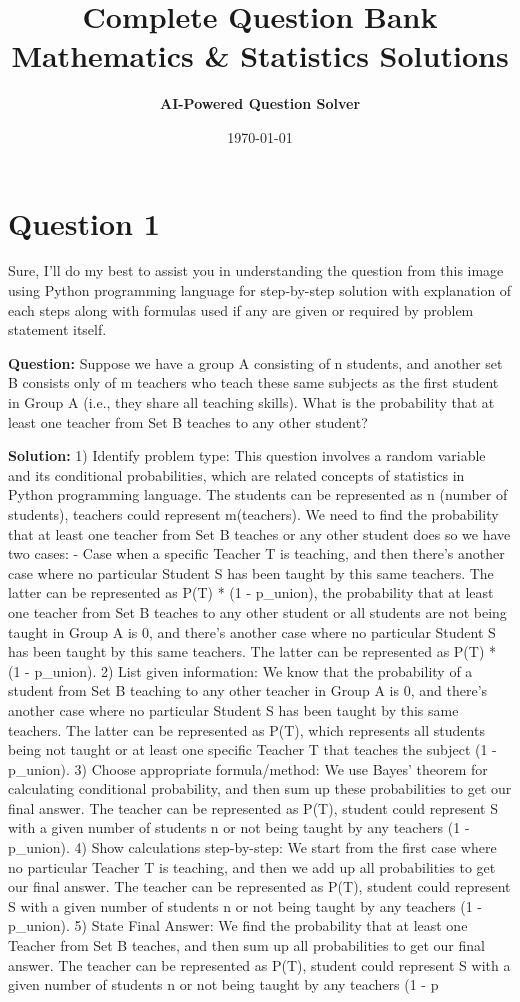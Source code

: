 \documentclass[12pt]{article}
\title{\textbf{Complete Question Bank}\\
\large{Mathematics \& Statistics Solutions}}
\author{\textbf{AI-Powered Question Solver}}
\date{\today}
\begin{document}
\maketitle
\newpage


\section*{Question 1}\n
Sure, I'll do my best to assist you in understanding the question from this image using Python programming language for step-by-step solution with explanation of each steps along with formulas used if any are given or required by problem statement itself. 

\textbf{Question:} Suppose we have a group A consisting of n students, and another set B consists only of m teachers who teach these same subjects as the first student in Group A (i.e., they share all teaching skills). What is the probability that at least one teacher from Set B teaches to any other student?

\textbf{Solution:} 
1) Identify problem type: This question involves a random variable and its conditional probabilities, which are related concepts of statistics in Python programming language. The students can be represented as n (number of students), teachers could represent m(teachers). We need to find the probability that at least one teacher from Set B teaches or any other student does so we have two cases: 
- Case when a specific Teacher T is teaching, and then there's another case where no particular Student S has been taught by this same teachers. The latter can be represented as P(T) * (1 - p_union), the probability that at least one teacher from Set B teaches to any other student or all students are not being taught in Group A is 0, and there's another case where no particular Student S has been taught by this same teachers. The latter can be represented as P(T) * (1 - p_union).
2) List given information: We know that the probability of a student from Set B teaching to any other teacher in Group A is 0, and there's another case where no particular Student S has been taught by this same teachers. The latter can be represented as P(T), which represents all students being not taught or at least one specific Teacher T that teaches the subject (1 - p_union).
3) Choose appropriate formula/method: We use Bayes' theorem for calculating conditional probability, and then sum up these probabilities to get our final answer.  The teacher can be represented as P(T), student could represent S with a given number of students n or not being taught by any teachers (1 - p_union).
4) Show calculations step-by-step: We start from the first case where no particular Teacher T is teaching, and then we add up all probabilities to get our final answer.  The teacher can be represented as P(T), student could represent S with a given number of students n or not being taught by any teachers (1 - p_union).
5) State Final Answer: We find the probability that at least one Teacher from Set B teaches, and then sum up all probabilities to get our final answer.  The teacher can be represented as P(T), student could represent S with a given number of students n or not being taught by any teachers (1 - p
\end{document}
